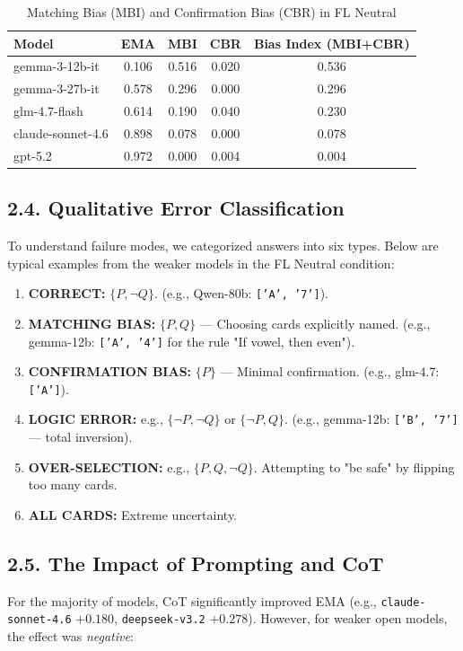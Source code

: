 \begin{table}[h!]
\centering
\caption{Matching Bias (MBI) and Confirmation Bias (CBR) in FL Neutral}
\label{tab:wason_bias}
\begin{tabular}{lcccc}
\toprule
\textbf{Model} & \textbf{EMA} & \textbf{MBI} & \textbf{CBR} & \textbf{Bias Index (MBI+CBR)} \\ 
\midrule
gemma-3-12b-it    & 0.106 & 0.516 & 0.020 & 0.536 \\
gemma-3-27b-it    & 0.578 & 0.296 & 0.000 & 0.296 \\
glm-4.7-flash     & 0.614 & 0.190 & 0.040 & 0.230 \\
claude-sonnet-4.6 & 0.898 & 0.078 & 0.000 & 0.078 \\
gpt-5.2           & 0.972 & 0.000 & 0.004 & 0.004 \\
\bottomrule
\end{tabular}
\end{table}

\subsection*{2.4. Qualitative Error Classification}
To understand failure modes, we categorized answers into six types. Below are typical examples from the weaker models in the FL Neutral condition:

\begin{enumerate}
    \item \textbf{CORRECT:} $\{P, \neg Q\}$. (e.g., Qwen-80b: \texttt{['A', '7']}).
    \item \textbf{MATCHING BIAS:} $\{P, Q\}$ --- Choosing cards explicitly named. (e.g., gemma-12b: \texttt{['A', '4']} for the rule "If vowel, then even").
    \item \textbf{CONFIRMATION BIAS:} $\{P\}$ --- Minimal confirmation. (e.g., glm-4.7: \texttt{['A']}).
    \item \textbf{LOGIC ERROR:} e.g., $\{\neg P, \neg Q\}$ or $\{\neg P, Q\}$. (e.g., gemma-12b: \texttt{['B', '7']} --- total inversion).
    \item \textbf{OVER-SELECTION:} e.g., $\{P, Q, \neg Q\}$. Attempting to "be safe" by flipping too many cards.
    \item \textbf{ALL CARDS:} Extreme uncertainty.
\end{enumerate}

\subsection*{2.5. The Impact of Prompting and CoT}
For the majority of models, CoT significantly improved EMA (e.g., \texttt{claude-sonnet-4.6} $+0.180$, \texttt{deepseek-v3.2} $+0.278$). However, for weaker open models, the effect was \textit{negative}:


